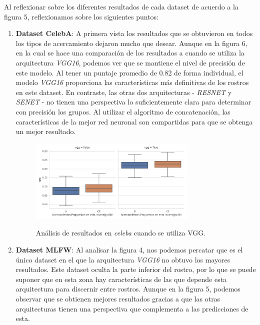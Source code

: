 \documentclass[letterpaper, 10 pt, conference]{ieeeconf}  %
\begin{document}
    Al reflexionar sobre los diferentes resultados de cada dataset de acuerdo a la
    figura 5, reflexionamos sobre los siguientes puntos:
    \begin{enumerate}
        \item \textbf{Dataset CelebA}: A primera vista los resultados que se obtuvieron en todos
            los tipos de acercamiento dejaron mucho que desear. Aunque en la
            figura 6, en la cual
            se hace una comparación de los resultados a cuando se utiliza la arquitectura 
            \textit{VGG16}, podemos ver que se mantiene el nivel de precisión de este modelo. Al
            tener un puntaje promedio de 0.82 de forma individual, el modelo \textit{VGG16}
            proporciona las características más definitivas de los rostros en este dataset. En
            contraste, las otras dos arquitecturas - \textit{RESNET} y \textit{SENET} - no
            tienen una perspectiva lo suficientemente clara para determinar con precisión los
            grupos. Al utilizar el algoritmo de concatenación, las características de la mejor
            red neuronal son compartidas para que se obtenga un mejor resultado.
            \begin{figure}[ht]
                \centering
                \includegraphics[width=8cm]{./figs/celeba_vgg.png}
                \label{fig: Results Celeba with VGG}
                \caption{Análisis de resultados en \textit{celeba} cuando se utiliza VGG.}
            \end{figure}
        \item \textbf{Dataset MLFW}: Al analisar la figura 4, nos podemos percatar que es el único
            dataset en el que la arquitectura \textit{VGG16} no obtuvo los mayores resultados.
            Este dataset oculta la parte inferior del rostro, por lo que se puede suponer que en
            esta zona hay características de las que depende esta arquitectura para discernir entre
            rostros.  Aunque en la figura 5, podemos observar que se obtienen mejores resultados
            gracias a que las otras arquitecturas tienen una perspectiva que complementa a las
            predicciones de esta.
    \end{enumerate}
\end{document}
